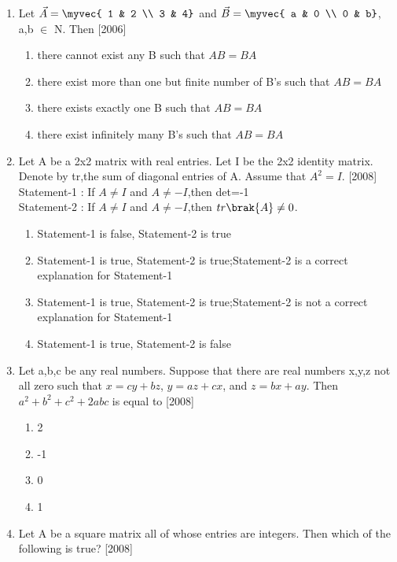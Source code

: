 \begin{enumerate}
\begin{enumerate}
		\end{enumerate}
	\item Let $\vec{A}=\myvec{
			1 & 2 \\
			3 & 4}$ and $\vec{B}=\myvec{
			a & 0 \\
			0 & b}$, a,b $\in$ N. Then \hfill{[2006]}
		\begin{enumerate}
			\item there cannot exist any B such that $AB=BA$
			\item there exist more than one but finite number of B's such that $AB=BA$
			\item there exists exactly one B such that $AB=BA$
			\item there exist infinitely many B's such that $AB=BA$
		\end{enumerate}
	\item Let A be a 2x2 matrix with real entries. Let I be the 2x2 identity matrix. Denote by tr,the sum of diagonal entries of A. Assume that $A^2 = I$. \hfill{[2008]} \\
		Statement-1 : If $A \neq I$ and $A \neq -I$,then det=-1 \\
		Statement-2 : If $A \neq I$ and $A \neq -I$,then $tr\brak{A} \neq 0$.
		\begin{enumerate}
			\item Statement-1 is false, Statement-2 is true
			\item Statement-1 is true, Statement-2 is true;Statement-2 is a correct explanation for Statement-1
			\item Statement-1 is true, Statement-2 is true;Statement-2 is not a correct explanation for Statement-1
			\item Statement-1 is true, Statement-2 is false
		\end{enumerate}
	\item Let a,b,c be any real numbers. Suppose that there are real numbers x,y,z not all zero such that $x=cy+bz$, $y=az+cx$, and $z=bx+ay$. Then $a^2+b^2+c^2+2abc$ is equal to \hfill{[2008]}
		\begin{enumerate}
			\item 2
			\item -1
			\item 0
			\item 1
		\end{enumerate}
	\item Let A be a square matrix all of whose entries are integers. Then which of the following is true? \hfill{[2008]}
		\begin{enumerate}

\end{enumerate}
\end{enumerate}
